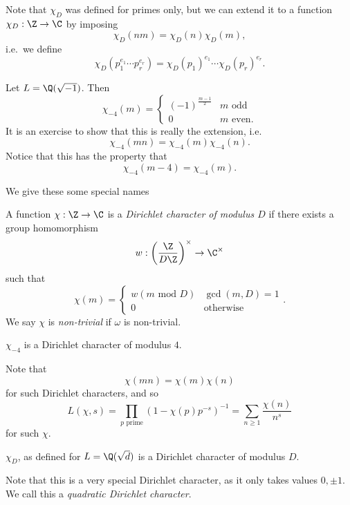 \documentclass[a4paper]{article}
\begin{document}
Note that $\chi_D$ was defined for primes only, but we can extend it to a function $\chi_D: \Z \to \C$ by imposing
\[
  \chi_D(nm) = \chi_D(n)\chi_D(m),
\]
i.e.\ we define
\[
  \chi_D(p_1^{e_1} \cdots p_r^{e_r}) = \chi_D(p_1)^{e_1} \cdots \chi_D(p_r)^{e_r}.
\]
\begin{eg}
  Let $L = \Q(\sqrt{-1})$. Then
  \[
    \chi_{-4}(m) =
    \begin{cases}
      (-1)^{\frac{m - 1}{2}} & m\text{ odd}\\
      0 & m\text{ even}.
    \end{cases}
  \]
  It is an exercise to show that this is really the extension, i.e.
  \[
    \chi_{-4}(mn) = \chi_{-4}(m) \chi_{-4}(n).
  \]
  Notice that this has the property that
  \[
    \chi_{-4}(m - 4) = \chi_{-4}(m).
  \]
\end{eg}
We give these some special names
\begin{defi}
  A function $\chi: \Z \to \C$ is a \emph{Dirichlet character of modulus $D$} if there exists a group homomorphism
  \[
    w: \left(\frac{\Z}{D\Z}\right)^\times \to \C^\times
  \]
  such that
  \[
    \chi(m) =
    \begin{cases}
      w(m\text{ mod } D) & \gcd(m, D) = 1\\
      0 & \text{otherwise}
    \end{cases}.
  \]
  We say $\chi$ is \emph{non-trivial} if $\omega$ is non-trivial.
\end{defi}

\begin{eg}
  $\chi_{-4}$ is a Dirichlet character of modulus $4$.
\end{eg}

Note that
\[
  \chi(mn) = \chi(m)\chi(n)
\]
for such Dirichlet characters, and so
\[
  L(\chi, s) = \prod_{p\text{ prime}} (1 - \chi(p)p^{-s})^{-1} = \sum_{n \geq 1} \frac{\chi(n)}{n^s}
\]
for such $\chi$.

\begin{prop}
  $\chi_D$, as defined for $L = \Q(\sqrt{d})$ is a Dirichlet character of modulus $D$.
\end{prop}
Note that this is a very special Dirichlet character, as it only takes values $0, \pm 1$. We call this a \emph{quadratic Dirichlet character}.
\end{document}
